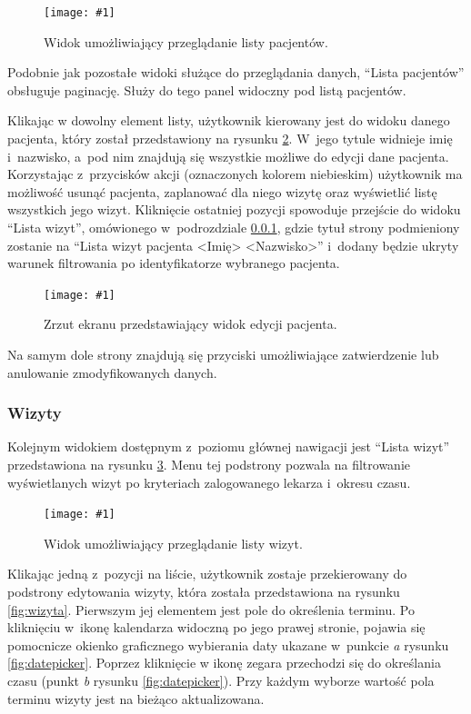 \documentclass[11pt]{aghdpl}
\newcommand{\fullWidthPicture}[2]{
\begin{figure}[h!]
	\centering
		\texttt{[image: \#1]}
	\caption{#2}
	\label{fig:#1}
\end{figure}
}
\begin{document}
\fullWidthPicture{pacjenci}{Widok umożliwiający przeglądanie listy pacjentów.}

Podobnie jak pozostałe widoki służące do przeglądania danych, ``Lista pacjentów'' obsługuje paginację. Służy do tego panel widoczny pod listą pacjentów.

Klikając w dowolny element listy, użytkownik kierowany jest do widoku danego pacjenta, który został przedstawiony na rysunku \ref{fig:pacjent}. W~jego tytule widnieje imię i~nazwisko, a~pod nim znajdują się wszystkie możliwe do edycji dane pacjenta. Korzystając z~przycisków akcji (oznaczonych kolorem niebieskim) użytkownik ma możliwość usunąć pacjenta, zaplanować dla niego wizytę oraz wyświetlić listę wszystkich jego wizyt. Kliknięcie ostatniej pozycji spowoduje przejście do widoku ``Lista wizyt'', omówionego w~podrozdziale \ref{sec:wizyty}, gdzie tytuł strony podmieniony zostanie na ``Lista wizyt pacjenta <Imię> <Nazwisko>'' i~dodany będzie ukryty warunek filtrowania po identyfikatorze wybranego pacjenta.

\fullWidthPicture{pacjent}{Zrzut ekranu przedstawiający widok edycji pacjenta.}

Na samym dole strony znajdują się przyciski umożliwiające zatwierdzenie lub anulowanie zmodyfikowanych danych.

\subsubsection{Wizyty}
\label{sec:wizyty}

Kolejnym widokiem dostępnym z~poziomu głównej nawigacji jest ``Lista wizyt'' przedstawiona na rysunku \ref{fig:wizyty}. Menu tej podstrony pozwala na filtrowanie wyświetlanych wizyt po kryteriach zalogowanego lekarza i~okresu czasu.

\fullWidthPicture{wizyty}{Widok umożliwiający przeglądanie listy wizyt.}

Klikając jedną z~pozycji na liście, użytkownik zostaje przekierowany do podstrony edytowania wizyty, która została przedstawiona na rysunku \ref{fig:wizyta}. Pierwszym jej elementem jest pole do określenia terminu. Po kliknięciu w~ikonę kalendarza widoczną po jego prawej stronie, pojawia się pomocnicze okienko graficznego wybierania daty ukazane w~punkcie \emph{a} rysunku \ref{fig:datepicker}. Poprzez kliknięcie w ikonę zegara przechodzi się do określania czasu (punkt \emph{b} rysunku \ref{fig:datepicker}). Przy każdym wyborze wartość pola terminu wizyty jest na bieżąco aktualizowana.
\end{document}
